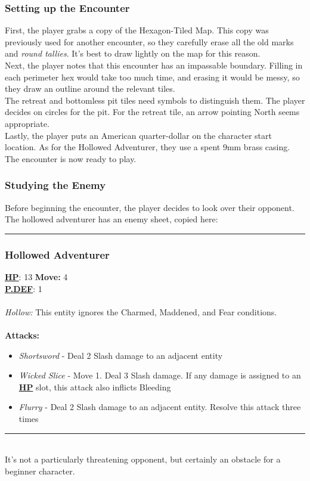 \documentclass[12pt]{article}
\newcommand{\refto}[1]{\hyperlink{#1}{\textbf{#1}}}
\begin{document}
\begin{multicols*}{2}
\subsubsection*{Setting up the Encounter}
First, the player grabs a copy of the Hexagon-Tiled Map. This copy was previously used for another encounter, so they carefully erase all the old marks and \emph{round tallies}. It’s best to draw lightly on the map for this reason.\\
Next, the player notes that this encounter has an impassable boundary. Filling in each perimeter hex would take too much time, and erasing it would be messy, so they draw an outline around the relevant tiles.\\
The retreat and bottomless pit tiles need symbols to distinguish them. The player decides on circles for the pit. For the retreat tile, an arrow pointing North seems appropriate.\\
Lastly, the player puts an American quarter-dollar on the character start location. As for the Hollowed Adventurer, they use a spent 9mm brass casing.\\
The encounter is now ready to play.

\subsubsection*{Studying the Enemy}
Before beginning the encounter, the player decides to look over their opponent. The hollowed adventurer has an enemy sheet, copied here:\\

\hrule
\subsubsection*{Hollowed Adventurer}
\refto{HP}: 13 \hspace*{2cm} \textbf{Move:} 4 \\
\refto{P.DEF}: 1 \\\\
\emph{Hollow:} This entity ignores the Charmed, Maddened, and Fear conditions.\\\\
\textbf{Attacks:}
\begin{itemize}
\item \emph{Shortsword} - Deal 2 Slash damage to an adjacent entity
\item \emph{Wicked Slice} - Move 1. Deal 3 Slash damage. If any damage is assigned to an \refto{HP} slot, this attack also inflicts Bleeding
\item \emph{Flurry} - Deal 2 Slash damage to an adjacent entity. Resolve this attack three times
\end{itemize}
\hrule
\ \\ 
It’s not a particularly threatening opponent, but certainly an obstacle for a beginner character.\\


\end{multicols*}
\end{document}
